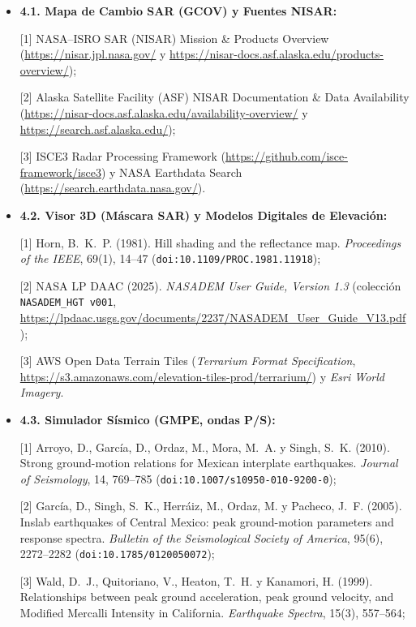 \documentclass[11pt,a4paper]{article}
\begin{document}
{\small

\begin{itemize}

    \item \textbf{4.1. Mapa de Cambio SAR (GCOV) y Fuentes NISAR:}

    [1] NASA--ISRO SAR (NISAR) Mission \& Products Overview (\url{https://nisar.jpl.nasa.gov/} y \url{https://nisar-docs.asf.alaska.edu/products-overview/});

    [2] Alaska Satellite Facility (ASF) NISAR Documentation \& Data Availability (\url{https://nisar-docs.asf.alaska.edu/availability-overview/} y \url{https://search.asf.alaska.edu/});

    [3] ISCE3 Radar Processing Framework (\url{https://github.com/isce-framework/isce3}) y NASA Earthdata Search (\url{https://search.earthdata.nasa.gov/}).

    \item \textbf{4.2. Visor 3D (M\'ascara SAR) y Modelos Digitales de Elevaci\'on:}

    [1] Horn, B.~K.~P. (1981). Hill shading and the reflectance map. \emph{Proceedings of the IEEE}, 69(1), 14--47 (\texttt{doi:10.1109/PROC.1981.11918});

    [2] NASA LP DAAC (2025). \emph{NASADEM User Guide, Version 1.3} (colecci\'on \texttt{NASADEM\_HGT v001}, \url{https://lpdaac.usgs.gov/documents/2237/NASADEM_User_Guide_V13.pdf});

    [3] AWS Open Data Terrain Tiles (\emph{Terrarium Format Specification}, \url{https://s3.amazonaws.com/elevation-tiles-prod/terrarium/}) y \emph{Esri World Imagery}.

    \item \textbf{4.3. Simulador S\'ismico (GMPE, ondas P/S):}

    [1] Arroyo, D., Garc\'ia, D., Ordaz, M., Mora, M.~A. y Singh, S.~K. (2010). Strong ground-motion relations for Mexican interplate earthquakes. \emph{Journal of Seismology}, 14, 769--785 (\texttt{doi:10.1007/s10950-010-9200-0});

    [2] Garc\'ia, D., Singh, S.~K., Herr\'aiz, M., Ordaz, M. y Pacheco, J.~F. (2005). Inslab earthquakes of Central Mexico: peak ground-motion parameters and response spectra. \emph{Bulletin of the Seismological Society of America}, 95(6), 2272--2282 (\texttt{doi:10.1785/0120050072});

    [3] Wald, D.~J., Quitoriano, V., Heaton, T.~H. y Kanamori, H. (1999). Relationships between peak ground acceleration, peak ground velocity, and Modified Mercalli Intensity in California. \emph{Earthquake Spectra}, 15(3), 557--564;


\end{itemize}}
\end{document}
